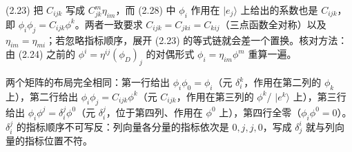 \begin{yizhu}[易错点]
(2.23) 把 $C_{ijk}$ 写成 $C^{m}_{jk}\eta_{im}$，而 (2.28) 中 $\phi_{i}$ 作用在 $|e_{j}\rangle$ 上给出的系数也是 $C_{ijk}$，即 $\phi_{i}\phi_{j}=C_{ijk}\phi^{k}$。两者一致要求 $C_{ijk}=C_{jki}=C_{kij}$（三点函数全对称）以及 $\eta_{im}=\eta_{mi}$；若忽略指标顺序，展开 (2.23) 的等式链就会差一个置换。核对方法：由 (2.24) 之前的 $\phi^{i}=\eta^{ij}(\phi_{D})_{j}$ 的对偶形式 $\phi_{i}=\eta_{im}\phi^{m}$ 重算一遍。
\end{yizhu}

\begin{yizhu}[易错点]
两个矩阵的布局完全相同：第一行给出 $\phi_{i}\phi_{0}=\phi_{i}$（元 $\delta^{k}_{i}$，作用在第二列的 $\phi_{k}$ 上），第二行给出 $\phi_{i}\phi_{j}=C_{ijk}\phi^{k}$（元 $C_{ijk}$，作用在第三列的 $\phi^{k}$/ $|e^{k}\rangle$ 上），第三行给出 $\phi_{i}\phi^{j}=\delta^{j}_{i}\phi^{0}$（元 $\delta^{j}_{i}$，位于第四列、作用在 $\phi^{0}$ 上），第四行全零（$\phi_{i}\phi^{0}=0$）。$\delta^{j}_{i}$ 的指标顺序不可写反：列向量各分量的指标依次是 $0,j,j,0$，写成 $\delta^{i}_{j}$ 就与列向量的指标位置不符。
\end{yizhu}

